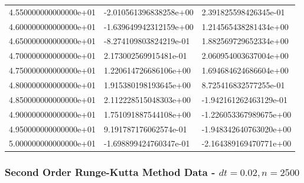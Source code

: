 \documentclass[pdf,color]{UoBnote}
\begin{document}
\begin{table}[H]
{\begin{tabular}{l|l|l}
    4.550000000000000e+01 & -2.010561396838258e+00 & 2.391825598426345e-01  \\
    4.600000000000000e+01 & -1.639649942312159e+00 & 1.214565438281434e+00  \\
    4.650000000000000e+01 & -8.274109803824219e-01 & 1.882569729652334e+00  \\
    4.700000000000000e+01 & 2.173002569915481e-01  & 2.060954003637004e+00  \\
    4.750000000000000e+01 & 1.220614726686106e+00  & 1.694684624686604e+00  \\
    4.800000000000000e+01 & 1.915380198193645e+00  & 8.725416832577255e-01  \\
    4.850000000000000e+01 & 2.112228515048303e+00  & -1.942161262463129e-01 \\
    4.900000000000000e+01 & 1.751091887544108e+00  & -1.226053367989675e+00 \\
    4.950000000000000e+01 & 9.191787176062574e-01  & -1.948342640763020e+00 \\
    5.000000000000000e+01 & -1.698899424760347e-01 & -2.164389169470771e+00 \\
    \end{tabular}
    }
\end{table}

\subsubsection{Second Order Runge-Kutta Method Data - $dt = 0.02, n = 2500$}
\end{document}
